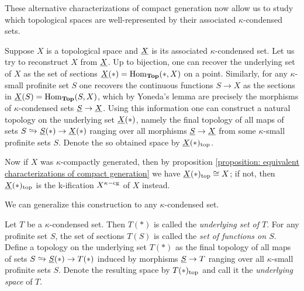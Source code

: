 These alternative characterizations of compact generation now allow us to study which topological spaces are well-represented by their associated $\kappa$-condensed sets.
\begin{remark}
	\label{remark: recovering a space from its associated condensed set}
	
	Suppose $X$ is a topological space and $\underline{X}$ is its associated $\kappa$-condensed set. Let us try to reconstruct $X$ from $\underline{X}$. Up to bijection, one can recover the underlying set of $X$ as the set of sections $\underline{X}(\ast)={\operatorname{Hom}}_{{\mathbf{Top}}}(\ast, X)$ on a point. Similarly, for any $\kappa$-small profinite set $S$ one recovers the continuous functions $S\to X$ as the sections in $\underline{X}(S)={\operatorname{Hom}}_{{\mathbf{Top}}}(S, X)$, which by Yoneda's lemma are precisely the morphisms of $\kappa$-condensed sets $\underline{S}\to \underline{X}$. Using this information one can construct a natural topology on the underlying set $\underline{X}(\ast)$, namely the final topology of all maps of sets $S\shortisorightarrow \associated{S}(\ast)\to \associated{X}(\ast)$ ranging over all morphisms $\underline{S}\to \underline{X}$ from some $\kappa$-small profinite sets $S$. Denote the so obtained space by ${\underline{X}(\ast)_\mathrm{top}}$.
	
	Now if $X$ was $\kappa$-compactly generated, then by proposition \ref{proposition: equivalent characterizations of compact generation} we have ${\underline{X}(\ast)_\mathrm{top}}\cong X$; if not, then ${\underline{X}(\ast)_\mathrm{top}}$ is the k-ification $X^{\kappa\mathrm{-cg}}$ of $X$ instead.
\end{remark}
	
We can generalize this construction to any $\kappa$-condensed set.
\begin{definition}
	\label{definition: the underlying space of a kappa-condensed set}
	
	Let $T$ be a $\kappa$-condensed set. Then $T(\ast)$ is called the \emph{underlying set of $T$}. For any profinite set $S$, the set of sections $T(S)$ is called the \emph{set of functions on $S$}. Define a topology on the underlying set $T(\ast)$ as the final topology of all maps of sets $S\shortisorightarrow \associated{S}(\ast)\to T(\ast)$ induced by morphisms $\underline{S}\to T$ ranging over all $\kappa$-small profinite sets $S$. Denote the resulting space by ${T(\ast)_\mathrm{top}}$ and call it the \emph{underlying space} of $T$.
\end{definition}

